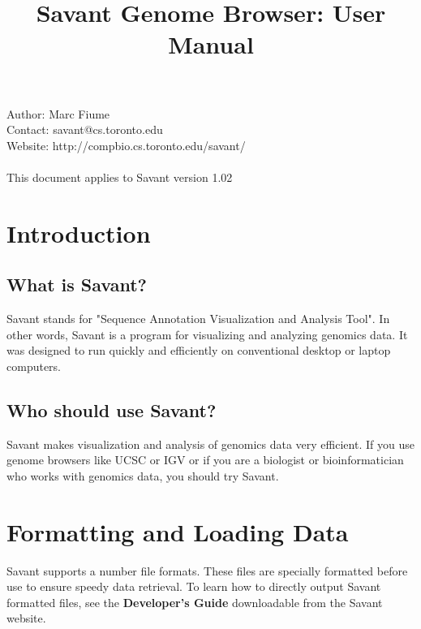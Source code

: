 \documentclass{report}
\begin{document}
\title{Savant Genome Browser: User Manual}
\maketitle

\setlength{\parindent}{0pt} 
\setlength{\parskip}{2ex}

Author: Marc Fiume \\
Contact: savant@cs.toronto.edu \\
Website: http://compbio.cs.toronto.edu/savant/ \\
\\
This document applies to Savant version 1.02\\

\newpage

\tableofcontents

\newpage

\chapter{Introduction}

\section{What is Savant?}

Savant stands for "Sequence Annotation Visualization and Analysis Tool". In other words, Savant is a program for visualizing and analyzing genomics data. It was designed to run quickly and efficiently on conventional desktop or laptop computers.

\section{Who should use Savant?}

Savant makes visualization and analysis of genomics data very efficient. If you use genome browsers like UCSC or IGV or if you are a biologist or bioinformatician who works with genomics data, you should try Savant. 

\chapter{Formatting and Loading Data}

Savant supports a number file formats. These files are specially formatted before use to ensure speedy data retrieval. To learn how to directly output Savant formatted files, see the {\bf Developer's Guide} downloadable from the Savant website.
\end{document}
